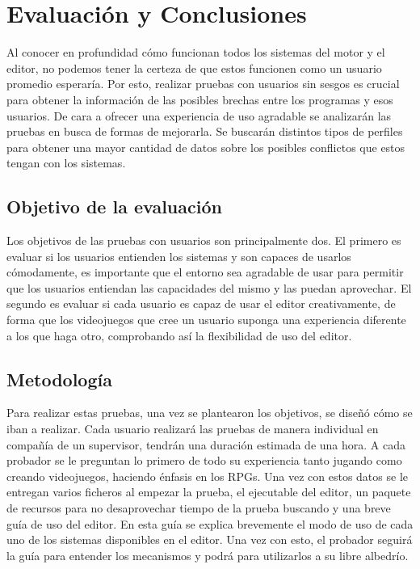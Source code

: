 \chapter{Evaluación y Conclusiones}
\label{cap:conclusiones}

Al conocer en profundidad cómo funcionan todos los sistemas del motor y el editor, no podemos tener la certeza de que estos funcionen como un usuario promedio esperaría. Por esto, realizar pruebas con usuarios sin sesgos es crucial para obtener la información de las posibles brechas entre los programas y esos usuarios. De cara a ofrecer una experiencia de uso agradable se analizarán las pruebas en busca de formas de mejorarla. Se buscarán distintos tipos de perfiles para obtener una mayor cantidad de datos sobre los posibles conflictos que estos tengan con los sistemas.

\section{Objetivo de la evaluación}
Los objetivos de las pruebas con usuarios son principalmente dos. El primero es evaluar si los usuarios entienden los sistemas y son capaces de usarlos cómodamente, es importante que el entorno sea agradable de usar para permitir que los usuarios entiendan las capacidades del mismo y las puedan aprovechar. El segundo es evaluar si cada usuario es capaz de usar el editor creativamente, de forma que los videojuegos que cree un usuario suponga una experiencia diferente a los que haga otro, comprobando así la flexibilidad de uso del editor.

\section{Metodología}
Para realizar estas pruebas, una vez se plantearon los objetivos, se diseñó cómo se iban a realizar. Cada usuario realizará las pruebas de manera individual en compañía de un supervisor, tendrán una duración estimada de una hora. A cada probador se le preguntan lo primero de todo su experiencia tanto jugando como creando videojuegos, haciendo énfasis en los RPGs. Una vez con estos datos se le entregan varios ficheros al empezar la prueba, el ejecutable del editor, un paquete de recursos para no desaprovechar tiempo de la prueba buscando y una breve guía de uso del editor. En esta guía se explica brevemente el modo de uso de cada uno de los sistemas disponibles en el editor. Una vez con esto, el probador seguirá la guía para entender los mecanismos y podrá para utilizarlos a su libre albedrío.

